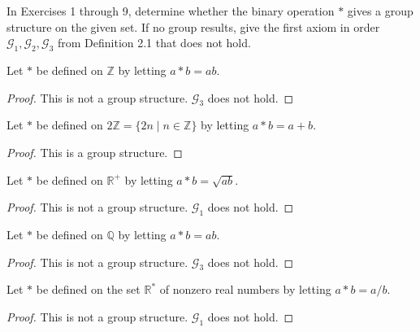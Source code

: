 In Exercises 1 through 9, determine whether the binary operation $*$ gives a group structure on the given set. If no group results, give the first axiom in order $\mathcal{G}_{1}, \mathcal{G}_{2}, \mathcal{G}_{3}$ from Definition 2.1 that does not hold.

\begin{exercise}
    Let $*$ be defined on $\mathbb{Z}$ by letting $a * b = ab$.
\end{exercise}

\begin{proof}
    This is not a group structure. $\mathcal{G}_{3}$ does not hold.
\end{proof}

\begin{exercise}
    Let $*$ be defined on $2\mathbb{Z} = \{ 2n \mid n\in\mathbb{Z} \}$ by letting $a * b = a + b$.
\end{exercise}

\begin{proof}
    This is a group structure.
\end{proof}

\begin{exercise}
    Let $*$ be defined on $\mathbb{R}^{+}$ by letting $a * b = \sqrt{ab}$.
\end{exercise}

\begin{proof}
    This is not a group structure. $\mathcal{G}_{1}$ does not hold.
\end{proof}

\begin{exercise}
    Let $*$ be defined on $\mathbb{Q}$ by letting $a * b = ab$.
\end{exercise}

\begin{proof}
    This is not a group structure. $\mathcal{G}_{3}$ does not hold.
\end{proof}

\begin{exercise}
    Let $*$ be defined on the set $\mathbb{R}^{*}$ of nonzero real numbers by letting $a * b = a/b$.
\end{exercise}

\begin{proof}
    This is not a group structure. $\mathcal{G}_{1}$ does not hold.
\end{proof}

